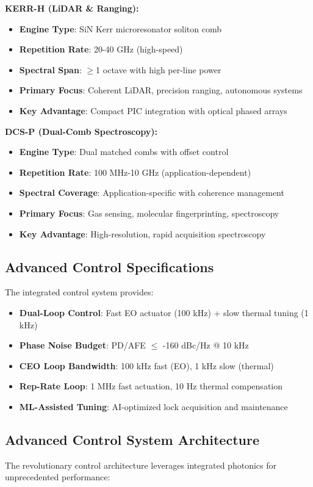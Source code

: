 \documentclass[11pt,a4paper]{article}
\begin{document}
\textbf{KERR-H (LiDAR \& Ranging):}
\begin{itemize}
\item \textbf{Engine Type}: SiN Kerr microresonator soliton comb
\item \textbf{Repetition Rate}: 20-40 GHz (high-speed)
\item \textbf{Spectral Span}: $\geq$1 octave with high per-line power
\item \textbf{Primary Focus}: Coherent LiDAR, precision ranging, autonomous systems
\item \textbf{Key Advantage}: Compact PIC integration with optical phased arrays
\end{itemize}

\textbf{DCS-P (Dual-Comb Spectroscopy):}
\begin{itemize}
\item \textbf{Engine Type}: Dual matched combs with offset control
\item \textbf{Repetition Rate}: 100 MHz-10 GHz (application-dependent)
\item \textbf{Spectral Coverage}: Application-specific with coherence management
\item \textbf{Primary Focus}: Gas sensing, molecular fingerprinting, spectroscopy
\item \textbf{Key Advantage}: High-resolution, rapid acquisition spectroscopy
\end{itemize}

\subsection{Advanced Control Specifications}
The integrated control system provides:
\begin{itemize}
\item \textbf{Dual-Loop Control}: Fast EO actuator (100 kHz) + slow thermal tuning (1 kHz)
\item \textbf{Phase Noise Budget}: PD/AFE $\leq$ -160 dBc/Hz @ 10 kHz
\item \textbf{CEO Loop Bandwidth}: 100 kHz fast (EO), 1 kHz slow (thermal)
\item \textbf{Rep-Rate Loop}: 1 MHz fast actuation, 10 Hz thermal compensation
\item \textbf{ML-Assisted Tuning}: AI-optimized lock acquisition and maintenance
\end{itemize}

\subsection{Advanced Control System Architecture}
The revolutionary control architecture leverages integrated photonics for unprecedented performance:
\end{document}
